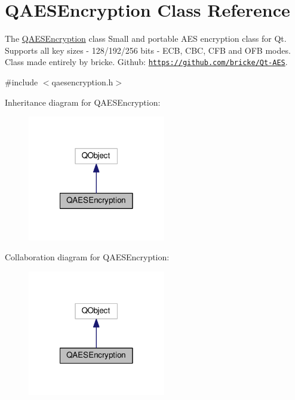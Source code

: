 \hypertarget{class_q_a_e_s_encryption}{\section{Q\-A\-E\-S\-Encryption Class Reference}
\label{class_q_a_e_s_encryption}
}


The \hyperlink{class_q_a_e_s_encryption}{Q\-A\-E\-S\-Encryption} class Small and portable A\-E\-S encryption class for Qt. Supports all key sizes -\/ 128/192/256 bits -\/ E\-C\-B, C\-B\-C, C\-F\-B and O\-F\-B modes. Class made entirely by bricke. Github\-: \href{https://github.com/bricke/Qt-AES}{\tt https\-://github.\-com/bricke/\-Qt-\/\-A\-E\-S}.  




{\ttfamily \#include $<$qaesencryption.\-h$>$}



Inheritance diagram for Q\-A\-E\-S\-Encryption\-:
\nopagebreak
\begin{figure}[H]
\begin{center}
\leavevmode
\includegraphics[width=170pt]{class_q_a_e_s_encryption__inherit__graph}
\end{center}
\end{figure}


Collaboration diagram for Q\-A\-E\-S\-Encryption\-:
\nopagebreak
\begin{figure}[H]
\begin{center}
\leavevmode
\includegraphics[width=170pt]{class_q_a_e_s_encryption__coll__graph}
\end{center}
\end{figure}
